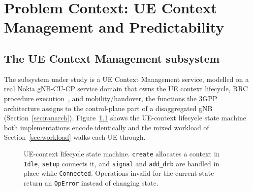 \chapter{Problem Context: UE Context Management and Predictability\label{chapter:context}}

\section{The UE Context Management subsystem}\label{sec:uecm}
The subsystem under study is a UE Context Management service, modelled on a real Nokia
gNB-CU-CP service domain that owns the UE context lifecycle, RRC procedure
execution~\cite{3gpp38331}, and mobility/handover, the functions the 3GPP architecture assigns
to the control-plane part of a disaggregated gNB (Section~\ref{sec:ranarch}).
Figure~\ref{fig:fsm} shows the UE-context lifecycle state machine both implementations encode
identically and the mixed workload of Section~\ref{sec:workload} walks each UE through.

\begin{figure}[ht]
\centering
{}
\caption[UE-context lifecycle state machine]{UE-context lifecycle state machine. \texttt{create} allocates a context in
\texttt{Idle}, \texttt{setup} connects it, and \texttt{signal} and \texttt{add\_drb} are handled
in place while \texttt{Connected}. Operations invalid for the current state return an
\texttt{OpError} instead of changing state.\label{fig:fsm}}
\end{figure}

